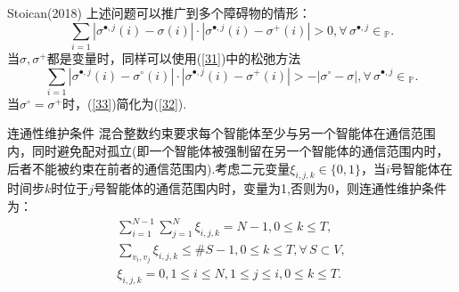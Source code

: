 \documentclass[notheorems,11pt]{beamer}
\theoremstyle{plain}
\numberwithin{theorem}{section}
\numberwithin{lemma}{section}
\numberwithin{corollary}{section}
\theoremstyle{example}
\begin{document}
\begin{frame}{Stoican(2018)}
  上述问题可以推广到多个障碍物的情形：
  \begin{equation}
    \sum_{i=1}{|\sigma^{\bullet,j}(i)-\sigma(i)|\cdot|\sigma^{\bullet,j}(i)-\sigma^+(i)|}>0,\forall\,\sigma^{\bullet,j}\in\textstyle_{\mathbb{P}}. \label{32}
  \end{equation}
  当$\sigma,\sigma^+$都是变量时，同样可以使用(\ref{31})中的松弛方法
  \begin{equation}
    \sum_{i=1}{|\sigma^{\bullet,j}(i)-\sigma^\circ(i)|\cdot|\sigma^{\bullet,j}(i)-\sigma^+(i)|}>-|\sigma^\circ-\sigma|,\forall\,\sigma^{\bullet,j}\in\textstyle_{\mathbb{P}}. \label{33}
  \end{equation}
  当$\sigma^\circ=\sigma^+$时，(\ref{33})简化为(\ref{32}).
\end{frame}

\begin{frame}{连通性维护条件}
  混合整数约束要求每个智能体至少与另一个智能体在通信范围内，同时避免配对孤立(即一个智能体被强制留在另一个智能体的通信范围内时，后者不能被约束在前者的通信范围内).考虑二元变量$\xi_{i,j,k}\in\{0,1\}$，当$i$号智能体在时间步$k$时位于$j$号智能体的通信范围内时，变量为1,否则为0，则连通性维护条件为：
  \begin{subequations}
    \begin{gather}
      \sum_{i=1}^{N-1}\sum_{j=1}^N\xi_{i,j,k}=N-1,0\leqslant k\leqslant T, \\
      \sum_{v_i,v_j}\xi_{i,j,k}\leqslant \# S-1,0\leqslant k\leqslant T,\forall\, S\subset V, \\
      \xi_{i,j,k}=0,1\leqslant i\leqslant N,1\leqslant j\leqslant i,0\leqslant k\leqslant T .
    \end{gather}
  \end{subequations}
\end{frame}


\end{document}

